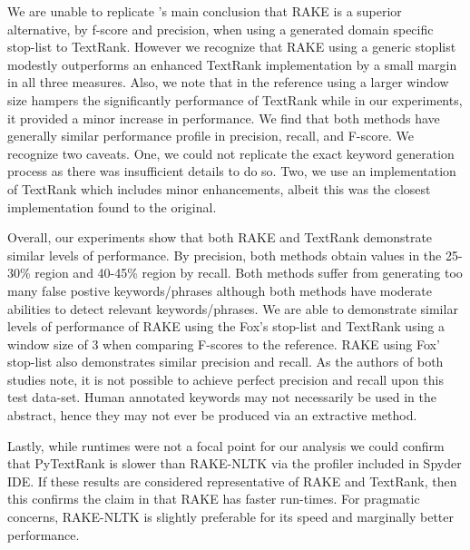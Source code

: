 \documentclass[11pt,a4paper]{article}
\begin{document}
We are unable to replicate \citet{1}'s main conclusion that RAKE is a superior alternative, by f-score and precision, when using a generated domain specific stop-list to TextRank. However we recognize that RAKE using a generic stoplist modestly outperforms an enhanced TextRank implementation by a small margin in all three measures. Also, we note that in the reference using a larger window size hampers the significantly performance of TextRank while in our experiments, it provided a minor increase in performance. We find that both methods have generally similar performance profile in precision, recall, and F-score. We recognize two caveats. One, we could not replicate the exact keyword generation process as there was insufficient details to do so. Two, we use an implementation of TextRank which includes minor enhancements, albeit this was the closest implementation found to the original. 

Overall, our experiments show that both RAKE and TextRank demonstrate similar levels of performance. By precision, both methods obtain values in the 25-30\% region and 40-45\% region by recall. Both methods suffer from generating too many false postive keywords/phrases although both methods have moderate abilities to detect relevant keywords/phrases. We are able to demonstrate similar levels of performance of RAKE using the Fox's stop-list and TextRank using a window size of 3 when comparing F-scores to the reference. RAKE using Fox' stop-list also demonstrates similar precision and recall. As the authors of both studies note, it is not possible to achieve perfect precision and recall upon this test data-set. Human annotated keywords may not necessarily be used in the abstract, hence they may not ever be produced via an extractive method.

Lastly, while runtimes were not a focal point for our analysis we could confirm that PyTextRank is slower than RAKE-NLTK via the profiler included in Spyder IDE. If these results are considered representative of RAKE and TextRank, then this confirms the claim in \citet{1} that RAKE has faster run-times. For pragmatic concerns, RAKE-NLTK is slightly preferable for its speed and marginally better performance.
\end{document}
